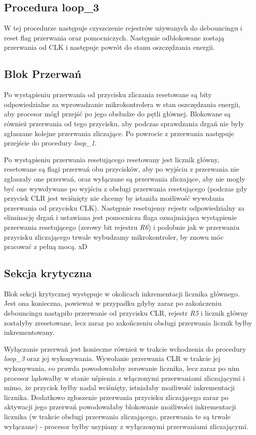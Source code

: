 \documentclass[fleqn]{article}
\begin{document}
\subsection{Procedura loop\_3}
		W tej procedurze następuje czyszczenie rejestrów używanych do debouncingu i reset flag przerwania oraz pomocniczych. Następnie odblokowane zostają przerwania od CLK i następuje powrót do stanu oszczędzania energii.

\subsection{Blok Przerwań}
		Po wystąpieniu przerwania od przycisku zliczania resetowane są bity odpowiedzialne za wprowadzanie mikrokontrolera w stan oszczędzania energii, aby procesor mógł przejść po jego obsłudze do pętli głównej. Blokowane są również przerwania od tego przycisku, aby podczas sprawdzania drgań nie były zgłaszane kolejne przerwania zliczające. Po powrocie z przerwania następuje przejście do procedury \textit{loop\_1}.

		Po wystąpieniu przerwania resetującego resetowany jest licznik główny, resetowane są flagi przerwań obu przycisków, aby po wyjściu z przerwania nie zgłaszały one przerwań, oraz wyłączane są przerwania zliczające, aby nie mogły być one wywoływane po wyjściu z obsługi przerwania resetującego (podczas gdy przycisk CLR jest wciśnięty nie chcemy by istaniła możliwość wywołania przerwania od przycisku CLK). Następnie resetujemy rejestr odpowiedzialny za eliminację drgań i ustawiana jest pomocnicza flaga oznajmiająca wystąpienie przerwania resetującego (zerowy bit rejestru \textit{R6}) i podobnie jak w przerwaniu przycisku zliczającego trwale wybudzamy mikrokontroler, by znowu móc pracować z pełną mocą. xD

\subsection{Sekcja krytyczna}
		Blok sekcji krytycznej występuje w okolicach inkrementacji licznika głównego. Jest ona konieczna, powieważ w przypadku gdyby zaraz po zakończeniu debouncingu nastąpiło przerwanie od przycisku CLR, rejestr \textit{R5} i licznik główny zostałyby zresetowane, lecz zaraz po zakończeniu obsługi przerwania licznik byłby inkrementowany.

		Wyłączanie przerwań jest konieczne również w trakcie wchodzenia do procedury \textit{loop\_3} oraz jej wykonywania. Wywołanie przerwania CLR w trakcie jej wykonywania, co prawda powodowałoby zerowanie licznika, lecz zaraz po nim procesor lądowałby w stanie uśpienia z włączonymi przerwaniami zliczającymi i mimo, że przycisk byłby nadal wciśnięty, istniałaby możliwość inkrementacji licznika. Dodatkowo zgłoszenie przerwania przycisku zliczającego zaraz po aktywacji jego przerwań powodowałaby blokowanie możliwości inkrementacji licznika (w trakcie obsługi przerwania zliczającego, przerwania te są trwale wyłączane) - procesor byłby usypiany z wyłączonymi przerwaniami zliczającymi.
\end{document}
